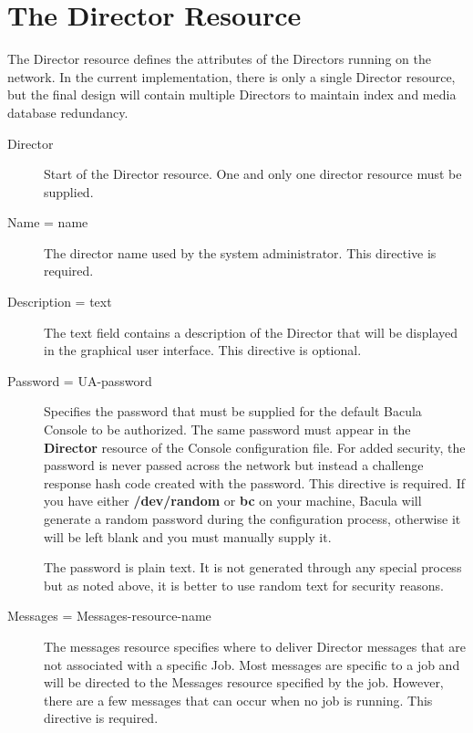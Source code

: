 \section{The Director Resource}
\label{DirectorResource4}

The Director resource defines the attributes of the Directors running on the
network. In the current implementation, there is only a single Director
resource, but the final design will contain multiple Directors to maintain
index and media database redundancy. 

\begin{description}

\item [Director]
   Start of the Director resource. One and only one  director resource must be
supplied.  

\item [Name = \lt{}name\gt{}]
   The director name used by the system  administrator. This directive is
required.  

\item [Description = \lt{}text\gt{}]
   The text field contains a  description of the Director that will be displayed
in the  graphical user interface. This directive is optional.  

\item [Password = \lt{}UA-password\gt{}]
   Specifies the password that must be supplied for the default Bacula
   Console to be authorized.  The same password must appear in the {\bf
   Director} resource of the Console configuration file.  For added
   security, the password is never passed across the network but instead a
   challenge response hash code created with the password.  This directive
   is required.  If you have either {\bf /dev/random} or {\bf bc} on your
   machine, Bacula will generate a random password during the configuration
   process, otherwise it will be left blank and you must manually supply
   it.

   The password is plain text.  It is not generated through any special
   process but as noted above, it is better to use random text for 
   security reasons.

\item [Messages = \lt{}Messages-resource-name\gt{}]
   The messages resource  specifies where to deliver Director messages that are
   not associated  with a specific Job. Most messages are specific to a job and
   will  be directed to the Messages resource specified by the job. However, 
   there are a few messages that can occur when no job is running.  This
   directive is required.  


\end{description}

